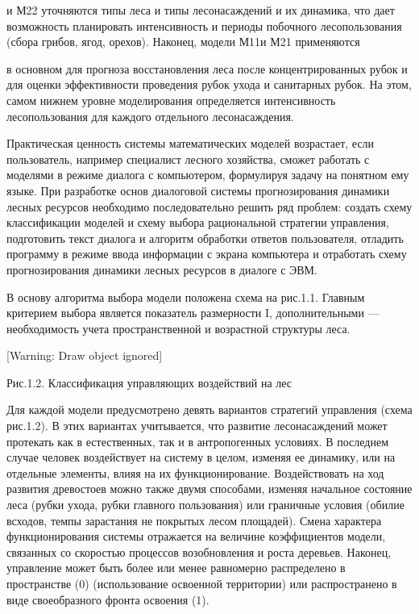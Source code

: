 \documentclass{report}
\begin{document}
и М22 уточ\-няются типы леса и типы лесонасаждений и их динамика, что дает возможность планировать интенсивность и
периоды побочного лесопользования (сбора грибов, ягод, орехов). Наконец, моде\-ли М11и М21 применяются 

в основном для прогноза восстановле\-ния леса после концентрированных рубок и для оценки эффектив\-ности проведения
рубок ухода и санитарных рубок. На этом, са\-мом нижнем уровне моделирования определяется интенсивность лесопользования
для каждого отдельного лесонасаждения.

Практическая цен\-ность системы математических моделей возрастает, если пользо\-ватель, например специалист лесного
хозяйства, сможет работать с моделями в режиме диалога с компьютером, формулируя задачу на по\-нятном ему языке. При
разработке основ диалоговой системы прогнозирования динамики лесных ресурсов необходимо последо\-вательно решить ряд
проблем: создать схему классификации мо\-делей и схему выбора рациональной стратегии управления, под\-готовить текст
диалога и алгоритм обработки ответов пользовате\-ля, отладить программу в режиме ввода информации с экрана компьютера 
и отработать схему прогнозирования динамики лесных ресурсов в диалоге с ЭВМ.

В основу алгоритма выбора модели положена схема на рис.1.1. Главным критерием выбора является показатель размерности I,
дополни\-тельными — необходимость учета пространственной и возрастной структуры леса.

[Warning: Draw object ignored]

Рис.1.2. Классификация управляющих воздействий на лес

Для каждой модели предусмотрено девять вариантов страте\-гий управления (схема рис.1.2). В этих вариантах учитывается,
что раз\-витие лесонасаждений может протекать как в естественных, так и в антропогенных условиях. В последнем случае
человек воздей\-ствует на систему в целом, изменяя ее динамику, или на отдельные элементы, влияя на их
функционирование. Воздействовать на ход развития древостоев можно также двумя способами, изменяя начальное состояние
леса (рубки ухода, рубки главного пользо\-вания) или граничные условия (обилие всходов, темпы зарастания не покрытых
лесом площадей). Смена характера функционирова\-ния системы отражается на величине коэффициентов модели, связанных со
скоростью процессов возобновления и роста деревь\-ев. Наконец, управление может быть более или менее равномерно
распределено в пространстве (0) (использование освоенной террито\-рии) или распространено в виде своеобразного фронта
освоения (1).
\end{document}
